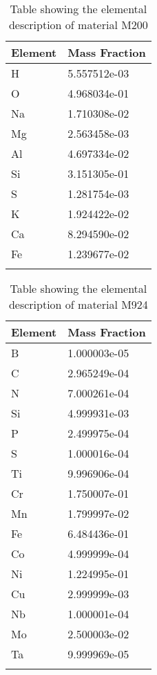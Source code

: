\begin{centering}
\begin{longtable}[ht!]
  { p{} | p{} }
\hline
Element & Mass Fraction\\
\hline
H &  5.557512e-03\\
O &  4.968034e-01\\
Na &  1.710308e-02\\
Mg &  2.563458e-03\\
Al &  4.697334e-02\\
Si &  3.151305e-01\\
S &  1.281754e-03\\
K &  1.924422e-02\\
Ca &  8.294590e-02\\
Fe &  1.239677e-02\\
\caption{Table showing the elemental description of material M200}
\label{table:material_M200}
\end{longtable}
\clearpage

\begin{longtable}[ht!]
{ p{} | p{} }
\hline
Element & Mass Fraction\\
\hline
B &  1.000003e-05\\
C &  2.965249e-04\\
N &  7.000261e-04\\
Si &  4.999931e-03\\
P &  2.499975e-04\\
S &  1.000016e-04\\
Ti &  9.996906e-04\\
Cr &  1.750007e-01\\
Mn &  1.799997e-02\\
Fe &  6.484436e-01\\
Co &  4.999999e-04\\
Ni &  1.224995e-01\\
Cu &  2.999999e-03\\
Nb &  1.000001e-04\\
Mo &  2.500003e-02\\
Ta &  9.999969e-05\\
\caption{Table showing the elemental description of material M924}
\label{table:material_EppDiagPipes}
\end{longtable}


\end{centering}
